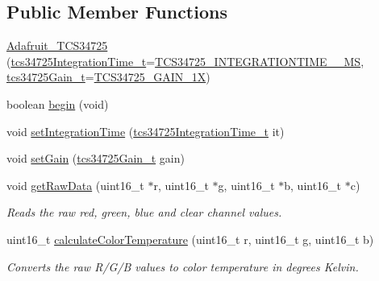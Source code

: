 \subsection*{Public Member Functions}
\begin{DoxyCompactItemize}
\item 
\hyperlink{class_adafruit___t_c_s34725_a2dd194daed0f6813b4e38f453e565572}{Adafruit\+\_\+\+T\+C\+S34725} (\hyperlink{_cool_adafruit___t_c_s34725_8h_a09f4624f70b21f0ec2526dbaedb5895e}{tcs34725\+Integration\+Time\+\_\+t}=\hyperlink{_cool_adafruit___t_c_s34725_8h_a09f4624f70b21f0ec2526dbaedb5895ea6568fa807d0d8a5eb73c7a8a5aed767c}{T\+C\+S34725\+\_\+\+I\+N\+T\+E\+G\+R\+A\+T\+I\+O\+N\+T\+I\+M\+E\+\_\+\_\+MS}, \hyperlink{_cool_adafruit___t_c_s34725_8h_a23611ba111ac38012551332ee7189f9a}{tcs34725\+Gain\+\_\+t}=\hyperlink{_cool_adafruit___t_c_s34725_8h_a23611ba111ac38012551332ee7189f9aae1a2aedc525bdbeefa83efdf1e6bdafa}{T\+C\+S34725\+\_\+\+G\+A\+I\+N\+\_\+1X})
\item 
boolean \hyperlink{class_adafruit___t_c_s34725_a568d79b6382ac27010a8afc26cbdae79}{begin} (void)
\item 
void \hyperlink{class_adafruit___t_c_s34725_a3c89fe5d4eea1f24f31d1afa9de8f0f3}{set\+Integration\+Time} (\hyperlink{_cool_adafruit___t_c_s34725_8h_a09f4624f70b21f0ec2526dbaedb5895e}{tcs34725\+Integration\+Time\+\_\+t} it)
\item 
void \hyperlink{class_adafruit___t_c_s34725_a6be06315a9d33f76e44550f574f023a5}{set\+Gain} (\hyperlink{_cool_adafruit___t_c_s34725_8h_a23611ba111ac38012551332ee7189f9a}{tcs34725\+Gain\+\_\+t} gain)
\item 
void \hyperlink{class_adafruit___t_c_s34725_abd9946a9baab1e0c76248cfe1864ea27}{get\+Raw\+Data} (uint16\+\_\+t $\ast$r, uint16\+\_\+t $\ast$g, uint16\+\_\+t $\ast$b, uint16\+\_\+t $\ast$c)
\begin{DoxyCompactList}\small\item\em Reads the raw red, green, blue and clear channel values. \end{DoxyCompactList}\item 
uint16\+\_\+t \hyperlink{class_adafruit___t_c_s34725_a9c6c7ab8a84a47a65ff04a125bcfee92}{calculate\+Color\+Temperature} (uint16\+\_\+t r, uint16\+\_\+t g, uint16\+\_\+t b)
\begin{DoxyCompactList}\small\item\em Converts the raw R/\+G/B values to color temperature in degrees Kelvin. \end{DoxyCompactList}\item 

\end{DoxyCompactItemize}
